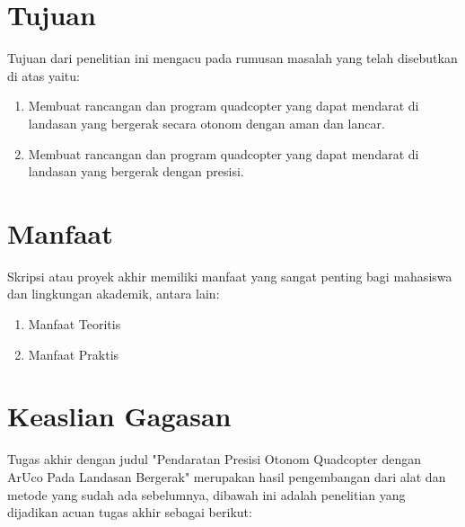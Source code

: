 \section{Tujuan}
Tujuan dari penelitian ini mengacu pada rumusan masalah yang
telah disebutkan di atas yaitu:

\begin{enumerate}
	\item Membuat rancangan dan program quadcopter yang dapat mendarat di landasan yang bergerak secara otonom dengan aman dan lancar.
	\item Membuat rancangan dan program quadcopter yang dapat mendarat di landasan yang bergerak dengan presisi.
\end{enumerate}

\section{Manfaat}
Skripsi atau proyek akhir memiliki manfaat yang sangat penting bagi mahasiswa dan lingkungan akademik, antara lain:
\begin{enumerate}
	\item Manfaat Teoritis
	\item Manfaat Praktis
\end{enumerate}
\section{Keaslian Gagasan}
Tugas akhir dengan judul "Pendaratan Presisi Otonom Quadcopter dengan ArUco Pada Landasan Bergerak" merupakan hasil pengembangan dari alat dan metode yang sudah ada sebelumnya, dibawah ini adalah penelitian yang dijadikan acuan tugas akhir sebagai berikut:

